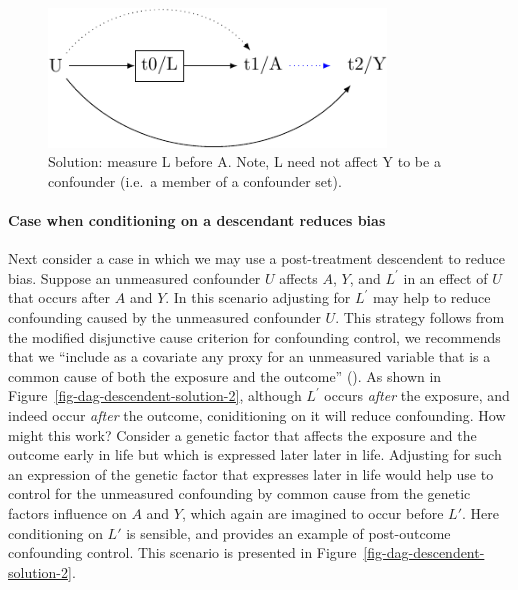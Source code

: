 \documentclass[
  singlecolumn,
  9pt]{article}
\let\oldparagraph\paragraph
\renewcommand{\paragraph}[1]{\oldparagraph{#1}\mbox{}}
\begin{document}
\begin{figure}

{\centering \includegraphics[width=0.8\textwidth,height=\textheight]{causal-dags_files/figure-pdf/fig-dag-descendent-solution-1.pdf}

}

\caption{\label{fig-dag-descendent-solution}Solution: measure L before
A. Note, L need not affect Y to be a confounder (i.e.~a member of a
confounder set).}

\end{figure}

\paragraph{Case when conditioning on a descendant reduces
bias}\label{case-when-conditioning-on-a-descendant-reduces-bias}

Next consider a case in which we may use a post-treatment descendent to
reduce bias. Suppose an unmeasured confounder \(U\) affects \(A\),
\(Y\), and \(L^\prime\) in an effect of \(U\) that occurs after \(A\)
and \(Y\). In this scenario adjusting for \(L^\prime\) may help to
reduce confounding caused by the unmeasured confounder \(U\). This
strategy follows from the modified disjunctive cause criterion for
confounding control, we recommends that we ``include as a covariate any
proxy for an unmeasured variable that is a common cause of both the
exposure and the outcome'' (). As shown in Figure~\ref{fig-dag-descendent-solution-2}, although
\(L^\prime\) occurs \emph{after} the exposure, and indeed occur
\emph{after} the outcome, coniditioning on it will reduce confounding.
How might this work? Consider a genetic factor that affects the exposure
and the outcome early in life but which is expressed later later in
life. Adjusting for such an expression of the genetic factor that
expresses later in life would help use to control for the unmeasured
confounding by common cause from the genetic factors influence on \(A\)
and \(Y\), which again are imagined to occur before \(L'\). Here
conditioning on \(L'\) is sensible, and provides an example of
post-outcome confounding control. This scenario is presented in
Figure~\ref{fig-dag-descendent-solution-2}.
\end{document}
